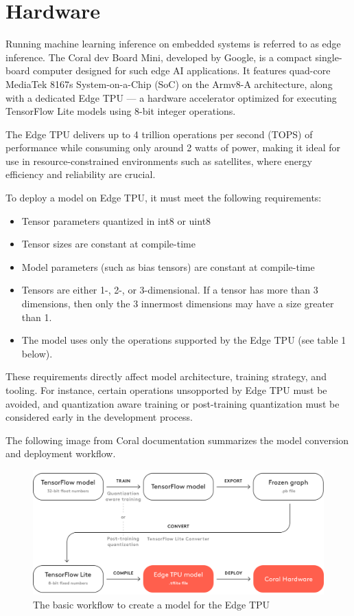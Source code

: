{\section{Hardware}
\label{subsec:hardware}

Running machine learning inference on embedded systems is referred to as edge inference.
The Coral dev Board Mini, developed by Google, is a compact single-board computer designed for such edge AI applications.
It features quad-core MediaTek 8167s System-on-a-Chip (SoC) on the Armv8-A architecture,
along with a dedicated Edge TPU --- a hardware accelerator optimized for executing TensorFlow Lite models using 8-bit integer operations.

The Edge TPU delivers up to 4 trillion operations per second (TOPS) of performance while consuming only around 2 watts of power,
making it ideal for use in resource-constrained environments such as satellites, where energy efficiency and reliability are crucial.

To deploy a model on Edge TPU, it must meet the following requirements:
\begin{itemize}
    \item Tensor parameters quantized in \gls{int8} or \gls{uint8}
    \item Tensor sizes are constant at compile-time
    \item Model parameters (such as bias tensors) are constant at compile-time
    \item Tensors are either 1-, 2-, or 3-dimensional. If a tensor has more than 3 dimensions, then only the 3 innermost dimensions may have a size greater than 1.
    \item The model uses only the operations supported by the Edge TPU (see table 1 below). 
\end{itemize}

These requirements directly affect model architecture, training strategy, and tooling. For instance, certain operations unsopported by Edge TPU must be avoided,
and quantization aware training or post-training quantization must be considered early in the development process.

The following image from Coral documentation summarizes the model conversion and deployment workflow.

\begin{figure}[H]
  \centering
  \includegraphics[width=\textwidth]{files/Edge_TPU_quantization.png}
  \caption{The basic workflow to create a model for the Edge TPU}
  \label{fig:quantization-chart}
\end{figure}

}
